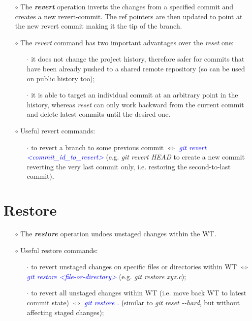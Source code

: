 \documentclass[a4paper,portrait,10pt]{article}   %
\newcommand{\mybulletlvA}{$\circ$}   %
\newcommand{\mybulletlvB}{$\cdot$}   %
\newcommand{\mydiv}{$\Leftrightarrow$ }   %
\newcommand{\mycmd}[1]{\textcolor{blue}{\textit{#1}}}   %
\newcommand{\myparvspace}{\vspace{4mm}}   %
\newcommand{\mysecvspace}{\vspace{6mm}}   %
\begin{document}
\begin{itemize}
\item[\mybulletlvA] The \textbf{\textit{revert}} operation inverts the changes from a specified commit and creates a new revert-commit. The ref pointers are then updated to point at the new revert commit making it the tip of the branch.
\myparvspace

\item[\mybulletlvA] The \textit{revert} command has two important advantages over the \textit{reset} one:
\begin{itemize}
  \item[\mybulletlvB] it does not change the project history, therefore safer for commits that have been already pushed to a shared remote repository (so can be used on public history too);
  \item[\mybulletlvB] it is able to target an individual commit at an arbitrary point in the history, whereas \textit{reset} can only work backward from the current commit and delete latest commits until the desired one.
\end{itemize}
\myparvspace

\item[\mybulletlvA] Useful revert commands:
\begin{itemize}
  \item[\mybulletlvB] to revert a branch to some previous commit \mydiv \mycmd{git revert <commit\_id\_to\_revert>} (e.g. \textit{git revert HEAD} to create a new commit reverting the very last commit only, i.e. restoring the second-to-last commit).
\end{itemize}
\end{itemize}
\mysecvspace


\section{Restore}   \label{sec:Restore}

\begin{itemize}
\item[\mybulletlvA] The \textbf{\textit{restore}} operation undoes unstaged changes within the WT.
\myparvspace

\item[\mybulletlvA] Useful restore commands:
\begin{itemize}
  \item[\mybulletlvB] to revert unstaged changes on specific files or directories within WT \mydiv \mycmd{git restore <file-or-directory>} (e.g. \textit{git restore xyz.c});
  \item[\mybulletlvB] to revert all unstaged changes within WT (i.e. move back WT to latest commit state) \mydiv \mycmd{git restore .} (similar to \textit{git reset -{}-hard}, but without affecting staged changes);
\end{itemize}
\end{itemize}
\mysecvspace
\end{document}
